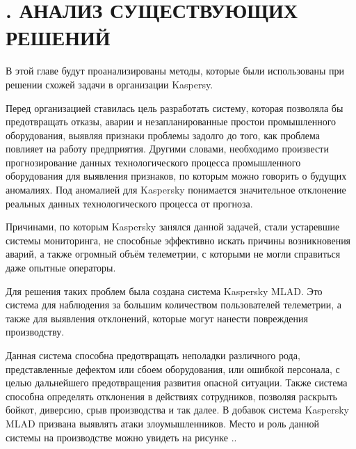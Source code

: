 \setcounter{chaptercntr}{2}

\sectionbreak \section*{
  \gostTitleFont
  \redline
  \thechaptercntr .
  АНАЛИЗ СУЩЕСТВУЮЩИХ РЕШЕНИЙ
}

\titlespace

{\gostFont

  \par \redline В этой главе будут проанализированы методы, которые были использованы при решении схожей задачи в организации Kaspersy.

  \par \redline	Перед организацией ставилась цель разработать систему, которая позволяла бы предотвращать отказы, аварии и незапланированные простои промышленного оборудования, выявляя признаки проблемы задолго до того, как проблема повлияет на работу предприятия. Другими словами, необходимо произвести прогнозирование данных технологического процесса промышленного оборудования для выявления признаков, по которым можно говорить о будущих аномалиях. Под аномалией для Kaspersky понимается значительное отклонение реальных данных технологического процесса от прогноза.

  \par \redline	Причинами, по которым Kaspersky занялся данной задачей, стали устаревшие системы мониторинга, не способные эффективно искать причины возникновения аварий, а также огромный объём телеметрии, с которыми не могли справиться даже опытные операторы.

  \par \redline	Для решения таких проблем была создана система Kaspersky MLAD. Это система для наблюдения за большим количеством пользователей телеметрии, а также для выявления отклонений, которые могут нанести повреждения производству.

  \par \redline Данная система способна предотвращать неполадки различного рода, представленные дефектом или сбоем оборудования, или ошибкой персонала, с целью дальнейшего предотвращения развития опасной ситуации. Также система способна определять отклонения в действиях сотрудников, позволяя раскрыть бойкот, диверсию, срыв производства и так далее. В добавок система Kaspersky MLAD призвана выявлять атаки злоумышленников. Место и роль данной системы на производстве можно увидеть на рисунке \thechaptercntr .\theimagecntr.

}
